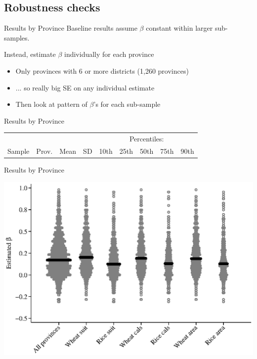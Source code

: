 \documentclass[10pt, xcolor=dvipsnames]{beamer}
\begin{document}
\subsection{Robustness checks}

\begin{frame}{Results by Province}\label{prov}
Baseline results assume $\beta$ constant within larger sub-samples. 

\vspace{.2cm}Instead, estimate $\beta$ individually for each province
\begin{itemize}
  \item Only provinces with 6 or more districts (1,260 provinces)
  \item ... so really big SE on any individual estimate
  \item Then look at pattern of $\beta$'s for each sub-sample
\end{itemize}
\end{frame}

\begin{frame}{Results by Province}

{\footnotesize
\begin{tabularx}{\textwidth}{lrrrXXXXX}
\midrule
           &       &      &     & \multicolumn{5}{c}{Percentiles:} \\ \cmidrule{5-9}
Sample & Prov. & Mean & SD  & 10th    & 25th    & 50th & 75th & 90th \\
\midrule

\midrule
\end{tabularx}
}

\hfill \hyperlink{robustness}{}
\end{frame}

\begin{frame}{Results by Province}
\begin{center}
\includegraphics[width=.8\textwidth]{fig_beta_province.eps}
\end{center}
\end{frame}
\end{document}
